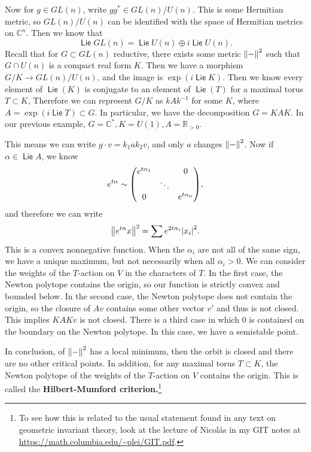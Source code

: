 \documentclass[leqno, openany]{memoir}
\theoremstyle{definition}
\theoremstyle{remark}
\theoremstyle{plain}
\theoremstyle{definition}
\theoremstyle{remark}
\newcommand{\R}{\mathbb{R}}
\newcommand{\C}{\mathbb{C}}
\DeclareMathOperator{\Lie}{\mathsf{Lie}}
\begin{document}
Now for $g \in GL(n)$, write $gg^* \in GL(n)/U(n)$. This is some Hermitian
metric, so $GL(n)/U(n)$ can be identified with the space of Hermitian metrics
on $\C^n$. Then we know that \[ \Lie GL(n) = \Lie U(n) \oplus i \Lie U(n). \]
Recall that for $G \subset GL(n)$ reductive, there exists some metric
$\norm{-}^2$ such that $G \cap U(n)$ is a compact real form $K$. Then we have a
morphism $G/K \to GL(n) / U(n)$, and the image is $\exp (i \Lie K)$. Then we
know every element of $\Lie(K)$ is conjugate to an element of $\Lie(T)$ for a
maximal torus $T \subset K$, Therefore we can represent $G/K$ as $kAk^{-1}$ for
some $K$, where $A = \exp(i \Lie T) \subset G$. In particular, we have the
decomposition $G = KAK$. In our previous example, $G = \C^*, K = U(1), A =
\R_{>0}$.

This means we can write $g \cdot v = k_1 a k_2 v$, and only $a$ changes
$\norm{-}^2$. Now if $\alpha \in \Lie A$, we know \[ e^{t \alpha} \sim \mqty(
e^{t \alpha_1} & & 0 \\ & \ddots & \\ 0 & & e^{t \alpha_n} ), \] and therefore
we can write \[ \norm{e^{t \alpha} x}^2 = \sum e^{2 t \alpha_i} \abs{x_i}^2. \]
This is a convex nonnegative function. When the $\alpha_i$ are not all of the
same sign, we have a unique maximum, but not necessarily when all $\alpha_i >
0$. We can consider the weights of the $T$-action on $V$ in the characters of
$T$. In the first case, the Newton polytope contains the origin, so our
function is strictly convex and bounded below. In the second case, the Newton
polytope does not contain the origin, so the closure of $Av$ contains some
other vector $v'$ and thus is not closed. This implies $KAKv$ is not closed.
There is a third case in which $0$ is contained on the boundary on the Newton
polytope. In this case, we have a semistable point.

In conclusion, of $\norm{-}^2$ has a local minimum, then the orbit is closed
and there are no other critical points. In addition, for any maximal torus $T
\subset K$, the Newton polytope of the weights of the $T$-action on $V$
contains the origin. This is called the \textbf{Hilbert-Mumford
criterion.}\footnote{To see how this is related to the usual statement found in
any text on geometric invariant theory, look at the lecture of Nicol\'as in my
GIT notes at \url{https://math.columbia.edu/~plei/GIT.pdf}.} 
\end{document}
